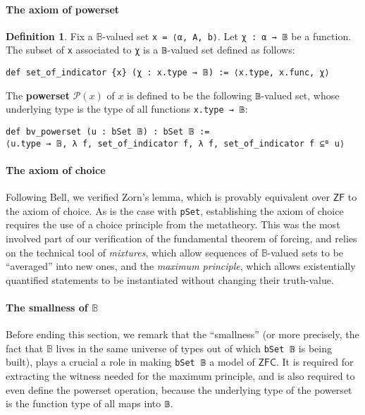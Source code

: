 \documentclass[a4paper,USenglish,cleveref, autoref]{lipics-v2019}
\newcommand{\B}{\mathbb{B}}
\newcommand{\lil}{\lstinline}
\theoremstyle{definition}
\newtheorem{defn}[theorem]{Definition}
\begin{document}
\paragraph*{The axiom of powerset}
\begin{defn}
  Fix a $\B$-valued set \lil{x = ⟨α, A, b⟩}. Let \lil{χ : α → 𝔹} be a function. The subset of \lil{x} associated to \lil{χ} is a \lil{𝔹}-valued set defined as follows:
\begin{lstlisting}
def set_of_indicator {x} (χ : x.type → 𝔹) := ⟨x.type, x.func, χ⟩
\end{lstlisting}

The \textbf{powerset} $\mathcal{P}(x)$ of $x$ is defined to be the following \lil{𝔹}-valued set, whose underlying type is the type of all functions \lil{x.type → 𝔹}:
\begin{lstlisting}
def bv_powerset (u : bSet 𝔹) : bSet 𝔹 :=
⟨u.type → 𝔹, λ f, set_of_indicator f, λ f, set_of_indicator f ⊆ᴮ u⟩
\end{lstlisting}
\end{defn}

\paragraph*{The axiom of choice}
Following Bell, we verified Zorn's lemma, which is provably equivalent over $\mathsf{ZF}$ to the axiom of choice. As is the case with \lil{pSet}, establishing the axiom of choice requires the use of a choice principle from the metatheory. This was the most involved part of our verification of the fundamental theorem of forcing, and relies on the technical tool of \emph{mixtures}, which allow sequences of $\B$-valued sets to be ``averaged'' into new ones, and the \emph{maximum principle}, which allows existentially quantified statements to be instantiated without changing their truth-value.

\paragraph*{The smallness of $\B$}
Before ending this section, we remark that the ``smallness'' (or more precisely, the fact that $\B$ lives in the same universe of types out of which \lil{bSet 𝔹} is being built), plays a crucial a role in making \lstinline{bSet 𝔹} a model of $\mathsf{ZFC}$. It is required for extracting the witness needed for the maximum principle, and is also required to even define the powerset operation, because the underlying type of the powerset is the function type of all maps into \lstinline{𝔹}.
\end{document}
